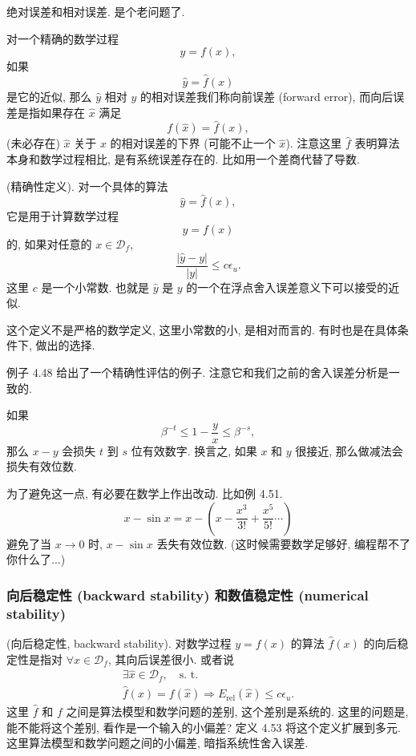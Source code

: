 \documentclass[a4paper]{ctexart}
\begin{document}
{ 绝对误差和相对误差. 是个老问题了.

 对一个精确的数学过程
$$
y = f(x),
$$
如果
$$
\hat{y} = \hat{f}(x)
$$
是它的近似, 那么 $\hat{y}$ 相对 $y$ 的相对误差我们称向前误差
(forward error), 而向后误差是指如果存在 $\hat{x}$ 满足
$$
f(\hat{x}) = \hat{f}(x),
$$
(未必存在) $\hat{x}$ 关于 $x$ 的相对误差的下界 (可能不止一个 $\hat{x}$).
注意这里 $\hat{f}$ 表明算法本身和数学过程相比, 是有系统误差存在的.
比如用一个差商代替了导数.

 (精确性定义). 对一个具体的算法
$$
\hat{y} = \hat{f}(x),
$$
它是用于计算数学过程
$$
y = f(x)
$$
的, 如果对任意的 $x \in \mathscr{D}_f$,
$$
\frac{|\hat{y} - y|}{|y|} \leq c \epsilon_u.
$$
这里 $c$ 是一个小常数. 也就是 $\hat{y}$ 是 $y$
的一个在浮点舍入误差意义下可以接受的近似.

这个定义不是严格的数学定义, 这里小常数的小, 是相对而言的.
有时也是在具体条件下, 做出的选择.

例子 4.48 给出了一个精确性评估的例子. 注意它和我们之前的舍入误差分析是一致的.

 如果
$$
\beta^{-t} \leq 1 - \frac{y}{x} \leq \beta^{-s},
$$
那么 $x - y$ 会损失 $t$ 到 $s$ 位有效数字. 换言之, 如果 $x$ 和 $y$ 很接近,
那么做减法会损失有效位数.

为了避免这一点, 有必要在数学上作出改动. 比如例 4.51.
$$
x - \sin x = x - \left(x - \frac{x^3}{3!} + \frac{x^5}{5!} \cdots\right)
$$
避免了当 $x \to 0$ 时, $x - \sin x$ 丢失有效位数. (这时候需要数学足够好,
编程帮不了你什么了...)

\subsubsection{向后稳定性 (backward stability) 和数值稳定性 (numerical stability)}

 (向后稳定性, backward stability). 对数学过程 $y = f(x)$
的算法 $\hat{f}(x)$ 的向后稳定性是指对 $\forall x \in \mathscr{D}_f$, 其向后误差很小.
或者说
$$
\begin{array}{l}
  \exists \hat{x} \in \mathscr{D}_f, \quad \mbox{s. t.} \\
  \hat{f}(x) = f(\hat{x}) \Rightarrow E_{\mbox{rel}}(\hat{x}) \leq c \epsilon_u.
\end{array}
$$
这里 $\hat{f}$ 和 $f$ 之间是算法模型和数学问题的差别, 这个差别是系统的. 这里的问题是,
能不能将这个差别, 看作是一个输入的小偏差? 定义 4.53 将这个定义扩展到多元.
这里算法模型和数学问题之间的小偏差, 暗指系统性舍入误差.

}
\end{document}
